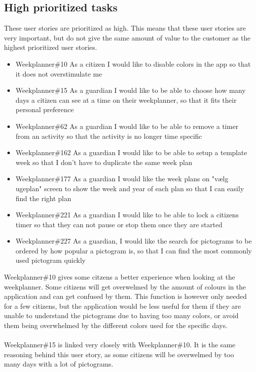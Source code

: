 \subsection{High prioritized tasks}
These user stories are prioritized as high. 
This means that these user stories are very important, but do not give the same amount of value to the customer as the highest prioritized user stories.
\begin{itemize}
    \item Weekplanner\#10 As a citizen I would like to disable colors in the app so that it does not overstimulate me
    \item Weekplanner\#15 As a guardian I would like to be able to choose how many days a citizen can see at a time on their weekplanner, so that it fits their personal preference 
    \item Weekplanner\#62 As a guardian I would like to be able to remove a timer from an activity so that the activity is no longer time specific
    \item Weekplanner\#162 As a guardian I would like to be able to setup a template week so that I don't have to duplicate the same week plan  
    \item Weekplanner\#177 As a guardian I would like the week plans on "vælg ugeplan" screen to show the week and year of each plan so that I can easily find the right plan 
    \item Weekplanner\#221 As a guardian I would like to be able to lock a citizens timer so that they can not pause or stop them once they are started
    \item Weekplanner\#227 As a guardian, I would like the search for pictograms to be ordered by how popular a pictogram is, so that I can find the most commonly used pictogram quickly
\end{itemize}
\noindent
Weekplanner\#10 gives some citzens a better experience when looking at the weekplanner. 
Some citizens will get overwelmed by the amount of colours in the application and can get confused by them. 
This function is however only needed for a few citizens, but the application would be less useful for them if they are unable to understand the pictograms due to having too many colors, or avoid them being overwhelmed by the different colors used for the specific days.
\\\\
Weekplanner\#15 is linked very closely with Weekplanner\#10. 
It is the same reasoning behind this user story, as some citizens will be overwelmed by too many days with a lot of pictograms. 
